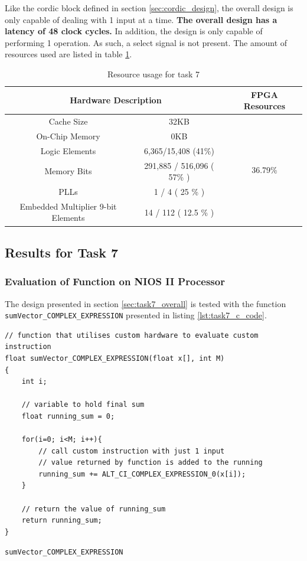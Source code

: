 \documentclass{article}
\begin{document}
Like the cordic block defined in section \ref{sec:cordic_design}, the overall design is only capable of dealing with 1 input at a time. \textbf{The overall design has a latency of 48 clock cycles.} In addition, the design is only capable of performing 1 operation. As such, a select signal is not present. The amount of resources used are listed in table \ref{tab:task7_resources}.


\begin{table}[H]
  \centering
    \begin{tabular}{|c|c|c|}
    \hline
    \multicolumn{2}{|c|}{\textbf{Hardware Description}} & \textbf{FPGA Resources} \\
    \hline
    Cache Size & 32KB  & \multirow{6}{*}{36.79\%} \\
\cline{1-2}    On-Chip Memory & 0KB   &  \\
\cline{1-2}    Logic Elements & 6,365/15,408 (41\%) &  \\
\cline{1-2}    Memory Bits & 291,885 / 516,096 ( 57\% ) &  \\
\cline{1-2}    PLLs  & 1 / 4 ( 25 \% ) &  \\
\cline{1-2}    Embedded Multiplier 9-bit Elements & 14 / 112 ( 12.5 \% ) &  \\
    \hline
    \end{tabular}%
  \caption{Resource usage for task 7}
  \label{tab:task7_resources}%
\end{table}%

\newpage
\subsection{Results for Task 7}\label{sec:task7_results}
\subsubsection{Evaluation of Function on NIOS II Processor}

The design presented in section \ref{sec:task7_overall} is tested with the function {\tt sumVector\_COMPLEX\_EXPRESSION} presented in listing \ref{lst:task7_c_code}.

\begin{listing}[H]
\begin{verbatim}
// function that utilises custom hardware to evaluate custom instruction
float sumVector_COMPLEX_EXPRESSION(float x[], int M)
{
	int i;
	
	// variable to hold final sum
	float running_sum = 0;
	
	for(i=0; i<M; i++){
        // call custom instruction with just 1 input
        // value returned by function is added to the running
        running_sum += ALT_CI_COMPLEX_EXPRESSION_0(x[i]);
	}
	
	// return the value of running_sum
	return running_sum;
}
\end{verbatim}
\caption{{\tt sumVector\_COMPLEX\_EXPRESSION}} 
\label{lst:task7_c_code}
\end{listing}
\end{document}
